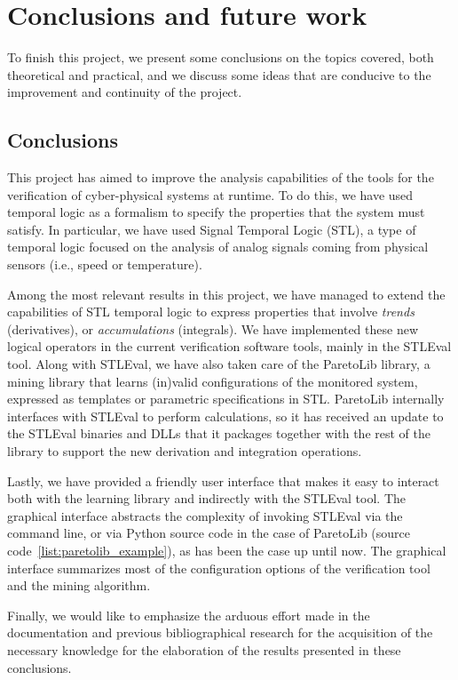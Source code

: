 \chapter{Conclusions and future work}
\label{cha:concl_en}
To finish this project, we present some conclusions on the topics covered, both theoretical and practical, and we discuss some ideas that are conducive to the improvement and continuity of the project.

\section{Conclusions}
This project has aimed to improve the analysis capabilities of the tools for the verification of cyber-physical systems at runtime. To do this, we have used temporal logic as a formalism to specify the properties that the system must satisfy. In particular, we have used Signal Temporal Logic (STL), a type of temporal logic focused on the analysis of analog signals coming from physical sensors (i.e., speed or temperature).

Among the most relevant results in this project, we have managed to extend the capabilities of STL temporal logic to express properties that involve \textit{trends} (derivatives), or \textit{accumulations} (integrals). We have implemented these new logical operators in the current verification software tools, mainly in the STLEval tool. Along with STLEval, we have also taken care of the ParetoLib library, a mining library that learns (in)valid configurations of the monitored system, expressed as templates or parametric specifications in STL. ParetoLib internally interfaces with STLEval to perform calculations, so it has received an update to the STLEval binaries and DLLs that it packages together with the rest of the library to support the new derivation and integration operations.

Lastly, we have provided a friendly user interface that makes it easy to interact both with the learning library and indirectly with the STLEval tool. The graphical interface abstracts the complexity of invoking STLEval via the command line, or via Python source code in the case of ParetoLib (source code~\ref{list:paretolib_example}), as has been the case up until now. The graphical interface summarizes most of the configuration options of the verification tool and the mining algorithm.

Finally, we would like to emphasize the arduous effort made in the documentation and previous bibliographical research for the acquisition of the necessary knowledge for the elaboration of the results presented in these conclusions.

